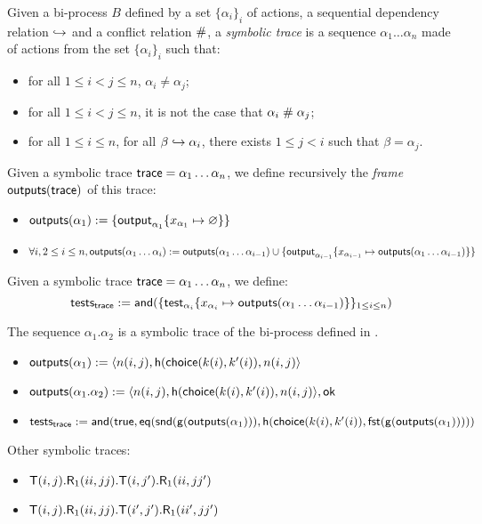 \begin{definition}
  Given a bi-process $B$ defined by a set $\{\alpha_i\}_i$ of actions, a sequential dependency relation $\hookrightarrow$ and a conflict relation $\mathrel{\#}$, a \emph{symbolic trace} is a sequence $\alpha_1 \dots \alpha_n$ made of actions from the set $\{\alpha_i\}_i$ such that:
  \begin{itemize}
    \item for all $1 \leq i < j \leq n$, $\alpha_i \neq \alpha_j$;
    \item for all $1 \leq i < j \leq n$, it is not the case that $\alpha_i \mathrel{\#} \alpha_j$;
    \item for all $1 \leq i \leq n$, for all $\beta \hookrightarrow \alpha_i$, there exists $1 \leq j < i$ such that $\beta = \alpha_j$.
  \end{itemize}
\end{definition}

\begin{definition}
  Given a symbolic trace $\textsf{trace} = \alpha_1 \dots \alpha_n$, we define recursively the \emph{frame} $\textsf{outputs}(\textsf{trace})$ of this trace:
  \begin{itemize}
    \item $\textsf{outputs}(\alpha_1) := \{ \textsf{output}_{\alpha_1}\{x_{\alpha_1} \mapsto \varnothing\} \}$
    \item $\forall i, 2 \leq i \leq n, \textsf{outputs}(\alpha_1 \dots \alpha_i) := \textsf{outputs}(\alpha_1 \dots \alpha_{i-1}) \cup \{ \textsf{output}_{\alpha_{i-1}}\{x_{\alpha_{i-1}} \mapsto \textsf{outputs}(\alpha_1 \dots \alpha_{i-1})\} \}$
  \end{itemize}
\end{definition}

\begin{definition}
  Given a symbolic trace $\textsf{trace} = \alpha_1 \dots \alpha_n$, we define:
  $$\textsf{tests}_{\textsf{trace}} := \mathsf{and}(\{ \textsf{test}_{\alpha_i}\{x_{\alpha_i}\mapsto\textsf{outputs}(\alpha_1 \dots \alpha_{i-1})\} \}_{1 \leq i \leq n})$$
\end{definition}

\begin{example}
  \label{ex:basic-hash-trace}
  The sequence $\alpha_1.\alpha_2$ is a symbolic trace of the bi-process defined in .
  \begin{itemize}
    \item $\textsf{outputs}(\alpha_1) := \langle n(i,j), \mathsf{h}(\mathsf{choice}(k(i),k'(i)),n(i,j) \rangle$
    \item $\textsf{outputs}(\alpha_1.\alpha_2) := \langle n(i,j), \mathsf{h}(\mathsf{choice}(k(i),k'(i)),n(i,j) \rangle, \mathsf{ok}$
    \item $\textsf{tests}_{\textsf{trace}} := \mathsf{and}(\textsf{true}, \mathsf{eq}(\mathsf{snd}(\mathsf{g}(\textsf{outputs}(\alpha_1))), \mathsf{h}(\mathsf{choice}(k(i),k'(i)),\mathsf{fst}(\mathsf{g}(\textsf{outputs}(\alpha_1)))))$
  \end{itemize}
  Other symbolic traces:
  \begin{itemize}
    \item $\textsf{T}(i,j).\textsf{R}_1(ii,jj).\textsf{T}(i,j').\textsf{R}_1(ii,jj')$
    \item $\textsf{T}(i,j).\textsf{R}_1(ii,jj).\textsf{T}(i',j').\textsf{R}_1(ii',jj')$
  \end{itemize}
\end{example}

